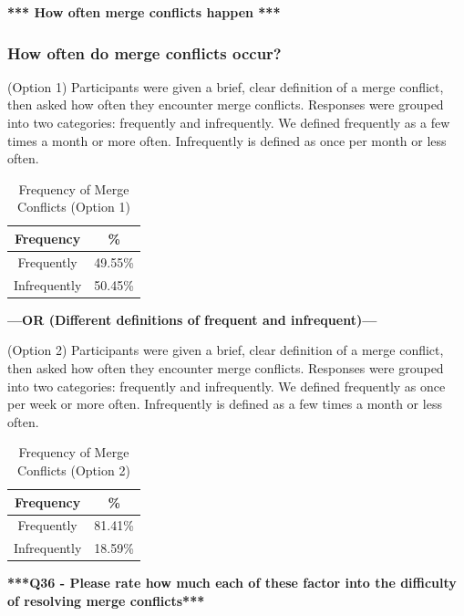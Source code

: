 \documentclass[conference]{IEEEtran}
\begin{document}
\textbf{*** How often merge conflicts happen ***}
\subsubsection{How often do merge conflicts occur?}
(Option 1) Participants were given a brief, clear definition of a merge conflict, then asked how often they encounter merge conflicts. Responses were grouped into two categories: frequently and infrequently. We defined frequently as a few times a month or more often. Infrequently is defined as once per month or less often.

\begin{table}[!t]
\renewcommand{\arraystretch}{1.3}
\caption{Frequency of Merge Conflicts (Option 1)}
\label{roles_table}
\centering
\begin{tabular}{|c||c|}
\hline
Frequency & \%\\
\hline
Frequently & 49.55\%\\
Infrequently & 50.45\%\\
\hline
\end{tabular}
\end{table}

\textbf{---OR (Different definitions of frequent and infrequent)---}

(Option 2) Participants were given a brief, clear definition of a merge conflict, then asked how often they encounter merge conflicts. Responses were grouped into two categories: frequently and infrequently. We defined frequently as once per week or more often. Infrequently is defined as a few times a month or less often.

\begin{table}[!t]
\renewcommand{\arraystretch}{1.3}
\caption{Frequency of Merge Conflicts (Option 2)}
\label{roles_table}
\centering
\begin{tabular}{|c||c|}
\hline
Frequency & \%\\
\hline
Frequently & 81.41\%\\
Infrequently & 18.59\%\\
\hline
\end{tabular}
\end{table}

\textbf{***Q36 - Please rate how much each of these factor into the difficulty of resolving merge conflicts***}
\end{document}
